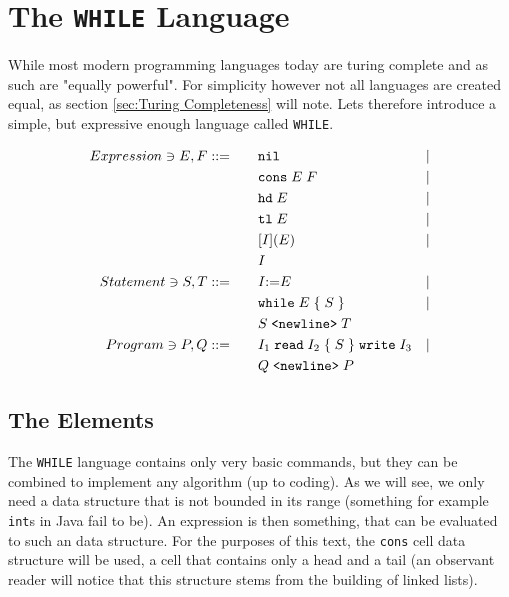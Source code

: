 \section{The {\tt WHILE} Language}
\label{sec:WHILE}
While most modern programming languages today are turing complete and as such
are "equally powerful". For simplicity however not all languages are created
equal, as section \ref{sec:Turing Completeness} will note. Lets therefore
introduce a simple, but expressive enough language called {\tt WHILE}.

\begin{figure}[h]
	\begin{align*}
		Expression \ni E, F::= \qquad
										& \mathtt{nil} & | \\
										& \mathtt{cons}\; E\; F & | \\
										& \mathtt{hd}\; E     & | \\
										& \mathtt{tl}\; E     & | \\
										& \mathtt{[}I \mathtt{](} E \mathtt{)}      & | \\
										& I \\
		Statement \ni S, T::= \qquad
										& I \mathtt{:=} E & | \\
										& \mathtt{while}\; E\; \mathtt{\{}\; S\; \mathtt{\}} & | \\
										& S \; \text{\tt{<newline>}}\; T \\
		Program \ni P, Q::= \qquad
										& I_1\; \mathtt{read}\; I_2\; \mathtt{\{}\; S\; \mathtt{\}}\; \mathtt{write}\; I_3 & | \\
										& Q  \; \text{\tt{<newline>}}\; P
	\end{align*}
\end{figure}

\subsection{The Elements} %
\label{sub:The Elements}
The {\tt WHILE} language contains only very basic commands, but they can be combined
to implement any algorithm (up to coding). As we will see, we only need a data
structure that is not bounded in its range (something for example {\tt int}s in
Java fail to be). An expression is then something, that can be evaluated to
such an data structure. For the purposes of this text, the {\tt cons} cell data
structure will be used, a cell that contains only a head and a tail (an
observant reader will notice that this structure stems from the building of
linked lists). 


